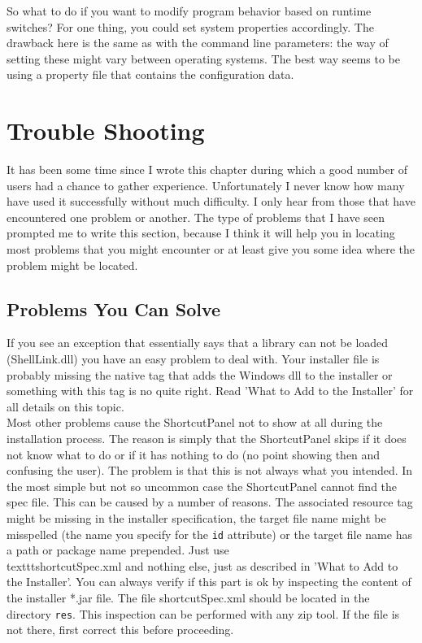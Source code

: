 So what to do if you want to modify program behavior based on runtime
switches? For one thing, you could set system properties accordingly.
The drawback here is the same as with the command line parameters: the
way of setting these might vary between operating systems. The best way
seems to be using a property file that contains the configuration
data.\\

\section{Trouble Shooting}

It has been some time since I wrote this chapter during which a good
number of users had a chance to gather experience. Unfortunately I
never know how many have used it successfully without much difficulty. I
only hear from those that have encountered one problem or another. The
type of problems that I have seen prompted me to write this section,
because I think it will help you in locating most problems that you might
encounter or at least give you some idea where the problem might be
located.\\

\subsection{Problems You Can Solve}

If you see an exception that essentially says that a library can not be
loaded (ShellLink.dll) you have an easy problem to deal with. Your
installer file is probably missing the native tag that adds the Windows
dll to the installer or something with this tag is no quite right. Read
'What to Add to the Installer' for all details on this topic.\\

Most other problems cause the ShortcutPanel not to show at all during
the installation process. The reason is simply that the ShortcutPanel
skips if it does not know what to do or if it has nothing to do (no
point showing then and confusing the user). The problem is that this is
not always what you intended. In the most simple but not so uncommon
case the ShortcutPanel cannot find the spec file. This can be caused by
a number of reasons. The associated resource tag might be missing in the
installer specification, the target file name might be misspelled (the
name you specify for the \texttt{id} attribute) or the target file name
has a path or package name prepended. Just use
\\texttt{shortcutSpec.xml} and nothing else, just as described in 'What
to Add to the Installer'. You can always verify if this part is ok by
inspecting the content of the installer *.jar file. The file
shortcutSpec.xml should be located in the directory \texttt{res}. This
inspection can be performed with any zip tool. If the file is not there,
first correct this before proceeding.\\

